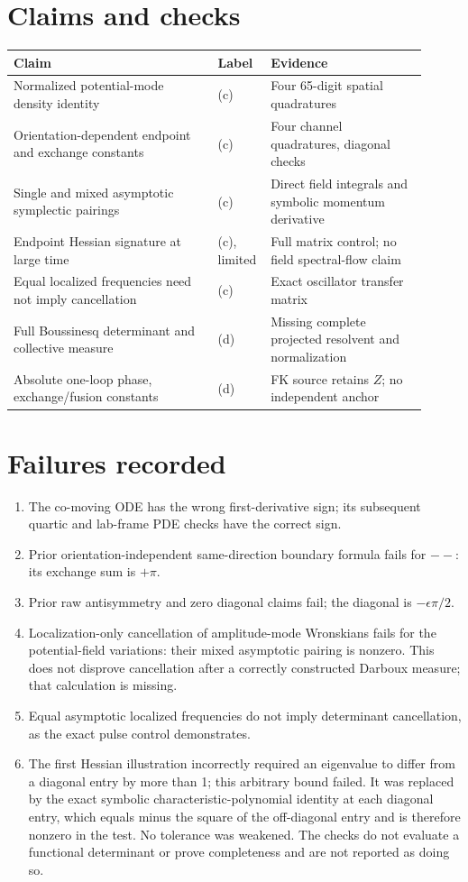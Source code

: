 \documentclass[11pt]{article}
\begin{document}
\section{Claims and checks}
\begin{longtable}{p{0.47\linewidth}p{0.08\linewidth}p{0.36\linewidth}}
\toprule Claim & Label & Evidence\\\midrule
Normalized potential-mode density identity & (c) & Four 65-digit spatial quadratures\\
Orientation-dependent endpoint and exchange constants & (c) & Four channel quadratures, diagonal checks\\
Single and mixed asymptotic symplectic pairings & (c) & Direct field integrals and symbolic momentum derivative\\
Endpoint Hessian signature at large time & (c), limited & Full matrix control; no field spectral-flow claim\\
Equal localized frequencies need not imply cancellation & (c) & Exact oscillator transfer matrix\\
Full Boussinesq determinant and collective measure & (d) & Missing complete projected resolvent and normalization\\
Absolute one-loop phase, exchange/fusion constants & (d) & FK source retains $Z$; no independent anchor\\
\bottomrule
\end{longtable}

\section{Failures recorded}
\begin{enumerate}
\item The co-moving ODE has the wrong first-derivative sign; its subsequent
quartic and lab-frame PDE checks have the correct sign.
\item Prior orientation-independent same-direction boundary formula fails for
$--$: its exchange sum is $+\pi$.
\item Prior raw antisymmetry and zero diagonal claims fail; the diagonal is
$-\epsilon\pi/2$.
\item Localization-only cancellation of amplitude-mode Wronskians fails for
the potential-field variations: their mixed asymptotic pairing is nonzero.
This does not disprove cancellation after a correctly constructed Darboux
measure; that calculation is missing.
\item Equal asymptotic localized frequencies do not imply determinant
cancellation, as the exact pulse control demonstrates.
\item The first Hessian illustration incorrectly required an eigenvalue to
differ from a diagonal entry by more than 1; this arbitrary bound failed. It
was replaced by the exact symbolic characteristic-polynomial identity at each
diagonal entry, which equals minus the square of the off-diagonal entry and
is therefore nonzero in the test. No tolerance was weakened. The checks do not evaluate a functional determinant or prove
completeness and are not reported as doing so.
\end{enumerate}
\end{document}
